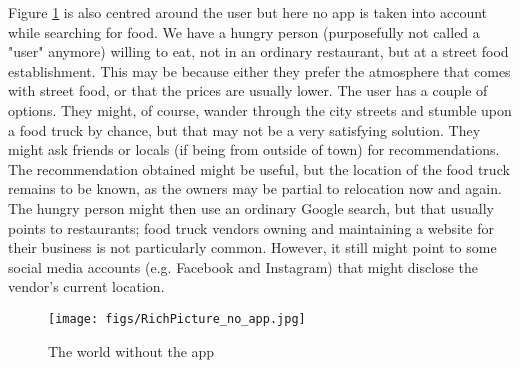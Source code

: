Figure \ref{Richpicture_noapp} is also centred around the user but here no app is taken into account while searching for food. We have a hungry person (purposefully not called a "user" anymore) willing to eat, not in an ordinary restaurant, but at a street food establishment. This may be because either they prefer the atmosphere that comes with street food, or that the prices are usually lower. The user has a couple of options. They might, of course, wander through the city streets and stumble upon a food truck by chance, but that may not be a very satisfying solution. They might ask friends or locals (if being from outside of town) for recommendations. The recommendation obtained might be useful, but the location of the food truck remains to be known, as the owners may be partial to relocation now and again. The hungry person might then use an ordinary Google search, but that usually points to restaurants; food truck vendors owning and maintaining a website for their business is not particularly common. However, it still might point to some social media accounts (e.g. Facebook and Instagram) that might disclose the vendor's current location.

\begin{figure}[h!]
  \centering
  \texttt{[image: figs/RichPicture\_no\_app.jpg]}
  \caption{The world without the app }
  \label{Richpicture_noapp}
\end{figure}
